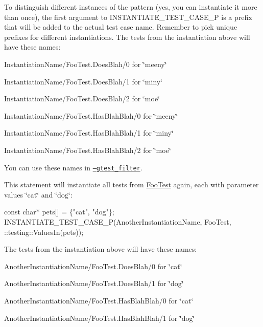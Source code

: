 To distinguish different instances of the pattern (yes, you can instantiate it more than once), the first argument to {\ttfamily I\+N\+S\+T\+A\+N\+T\+I\+A\+T\+E\+\_\+\+T\+E\+S\+T\+\_\+\+C\+A\+S\+E\+\_\+P} is a prefix that will be added to the actual test case name. Remember to pick unique prefixes for different instantiations. The tests from the instantiation above will have these names\+:


\begin{DoxyItemize}
\item {\ttfamily Instantiation\+Name/\+Foo\+Test.\+Does\+Blah/0} for {\ttfamily \char`\"{}meeny\char`\"{}}
\item {\ttfamily Instantiation\+Name/\+Foo\+Test.\+Does\+Blah/1} for {\ttfamily \char`\"{}miny\char`\"{}}
\item {\ttfamily Instantiation\+Name/\+Foo\+Test.\+Does\+Blah/2} for {\ttfamily \char`\"{}moe\char`\"{}}
\item {\ttfamily Instantiation\+Name/\+Foo\+Test.\+Has\+Blah\+Blah/0} for {\ttfamily \char`\"{}meeny\char`\"{}}
\item {\ttfamily Instantiation\+Name/\+Foo\+Test.\+Has\+Blah\+Blah/1} for {\ttfamily \char`\"{}miny\char`\"{}}
\item {\ttfamily Instantiation\+Name/\+Foo\+Test.\+Has\+Blah\+Blah/2} for {\ttfamily \char`\"{}moe\char`\"{}}
\end{DoxyItemize}

You can use these names in \href{#running-a-subset-of-the-tests}{\tt --gtest\+\_\+filter}.

This statement will instantiate all tests from {\ttfamily \hyperlink{class_foo_test}{Foo\+Test}} again, each with parameter values {\ttfamily \char`\"{}cat\char`\"{}} and {\ttfamily \char`\"{}dog\char`\"{}}\+:


\begin{DoxyCode}
const char* pets[] = \{"cat", "dog"\};
INSTANTIATE\_TEST\_CASE\_P(AnotherInstantiationName, FooTest,
                        ::testing::ValuesIn(pets));
\end{DoxyCode}


The tests from the instantiation above will have these names\+:


\begin{DoxyItemize}
\item {\ttfamily Another\+Instantiation\+Name/\+Foo\+Test.\+Does\+Blah/0} for {\ttfamily \char`\"{}cat\char`\"{}}
\item {\ttfamily Another\+Instantiation\+Name/\+Foo\+Test.\+Does\+Blah/1} for {\ttfamily \char`\"{}dog\char`\"{}}
\item {\ttfamily Another\+Instantiation\+Name/\+Foo\+Test.\+Has\+Blah\+Blah/0} for {\ttfamily \char`\"{}cat\char`\"{}}
\item {\ttfamily Another\+Instantiation\+Name/\+Foo\+Test.\+Has\+Blah\+Blah/1} for {\ttfamily \char`\"{}dog\char`\"{}}
\end{DoxyItemize}

